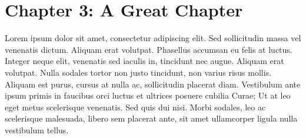 \section*{Chapter 3: A Great Chapter}

Lorem ipsum dolor sit amet, consectetur adipiscing elit. Sed sollicitudin massa vel venenatis dictum. Aliquam erat volutpat. Phasellus accumsan eu felis at luctus. Integer neque elit,  venenatis sed iaculis in, tincidunt nec augue. Aliquam erat volutpat. Nulla sodales tortor non justo tincidunt, non varius risus mollis. Aliquam est purus, cursus at nulla ac, sollicitudin placerat diam. Vestibulum ante ipsum primis in faucibus orci luctus et ultrices posuere cubilia Curae; Ut 
at leo eget metus scelerisque venenatis. Sed quis dui nisi. Morbi sodales, leo ac scelerisque malesuada, libero sem placerat ante,  sit amet ullamcorper ligula nulla vestibulum tellus.

